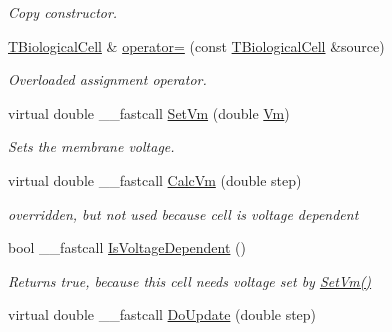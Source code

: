 \begin{DoxyCompactItemize}
\begin{DoxyCompactList}\small\item\em Copy constructor. \end{DoxyCompactList}\item 
\hypertarget{class_t_biological_cell_a3f2c8a0990ea1c461341a9290add4cc9}{\hyperlink{class_t_biological_cell}{T\+Biological\+Cell} \& \hyperlink{class_t_biological_cell_a3f2c8a0990ea1c461341a9290add4cc9}{operator=} (const \hyperlink{class_t_biological_cell}{T\+Biological\+Cell} \&source)}\label{class_t_biological_cell_a3f2c8a0990ea1c461341a9290add4cc9}

\begin{DoxyCompactList}\small\item\em Overloaded assignment operator. \end{DoxyCompactList}\item 
\hypertarget{class_t_biological_cell_a05e8945af2d83f4a7c4d10227af62c00}{virtual double \+\_\+\+\_\+fastcall \hyperlink{class_t_biological_cell_a05e8945af2d83f4a7c4d10227af62c00}{Set\+Vm} (double \hyperlink{class_t_cell_afd81f2fd923ffbfa5ea7eda2c50693d1}{Vm})}\label{class_t_biological_cell_a05e8945af2d83f4a7c4d10227af62c00}

\begin{DoxyCompactList}\small\item\em Sets the membrane voltage. \end{DoxyCompactList}\item 
\hypertarget{class_t_biological_cell_a1d4ee3bb8f2896a4184ee41e2eb9abb4}{virtual double \+\_\+\+\_\+fastcall \hyperlink{class_t_biological_cell_a1d4ee3bb8f2896a4184ee41e2eb9abb4}{Calc\+Vm} (double step)}\label{class_t_biological_cell_a1d4ee3bb8f2896a4184ee41e2eb9abb4}

\begin{DoxyCompactList}\small\item\em overridden, but not used because cell is voltage dependent \end{DoxyCompactList}\item 
\hypertarget{class_t_biological_cell_ab862a6ed960895ffbc1b38c56955f447}{bool \+\_\+\+\_\+fastcall \hyperlink{class_t_biological_cell_ab862a6ed960895ffbc1b38c56955f447}{Is\+Voltage\+Dependent} ()}\label{class_t_biological_cell_ab862a6ed960895ffbc1b38c56955f447}

\begin{DoxyCompactList}\small\item\em Returns true, because this cell needs voltage set by \hyperlink{class_t_biological_cell_a05e8945af2d83f4a7c4d10227af62c00}{Set\+Vm()} \end{DoxyCompactList}\item 
\hypertarget{class_t_biological_cell_a01a90abdda47cd3258a28027c52b26ac}{virtual double \+\_\+\+\_\+fastcall \hyperlink{class_t_biological_cell_a01a90abdda47cd3258a28027c52b26ac}{Do\+Update} (double step)}\label{class_t_biological_cell_a01a90abdda47cd3258a28027c52b26ac}


\end{DoxyCompactItemize}

